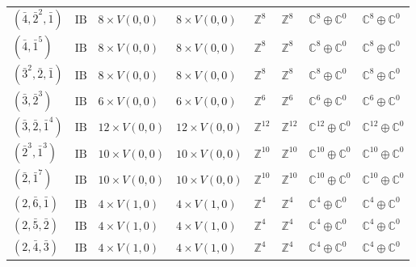 \documentclass[11pt,a4paper]{article}
\begin{document}
\begin{appendix}
\begin{table}
\begin{tabular}{C{2.65cm}C{0.85cm}C{3.0cm}C{3.0cm}C{2.25cm}C{2.25cm}C{1.55cm}C{1.55cm}}
\((\bar{4}, \bar{2}^{2}, \bar{1})\) & \(\mathrm{IB}\) & \(8 \times V(0,0)\) & \(8 \times V(0,0)\) & \(\mathbb{Z}^{8}\) & \(\mathbb{Z}^{8}\) & \(\mathbb{C}^{8} \oplus \mathbb{C}^{0}\) & \(\mathbb{C}^{8} \oplus \mathbb{C}^{0}\) \\
\((\bar{4}, \bar{1}^{5})\) & \(\mathrm{IB}\) & \(8 \times V(0,0)\) & \(8 \times V(0,0)\) & \(\mathbb{Z}^{8}\) & \(\mathbb{Z}^{8}\) & \(\mathbb{C}^{8} \oplus \mathbb{C}^{0}\) & \(\mathbb{C}^{8} \oplus \mathbb{C}^{0}\) \\
\((\bar{3}^{2}, \bar{2}, \bar{1})\) & \(\mathrm{IB}\) & \(8 \times V(0,0)\) & \(8 \times V(0,0)\) & \(\mathbb{Z}^{8}\) & \(\mathbb{Z}^{8}\) & \(\mathbb{C}^{8} \oplus \mathbb{C}^{0}\) & \(\mathbb{C}^{8} \oplus \mathbb{C}^{0}\) \\
\((\bar{3}, \bar{2}^{3})\) & \(\mathrm{IB}\) & \(6 \times V(0,0)\) & \(6 \times V(0,0)\) & \(\mathbb{Z}^{6}\) & \(\mathbb{Z}^{6}\) & \(\mathbb{C}^{6} \oplus \mathbb{C}^{0}\) & \(\mathbb{C}^{6} \oplus \mathbb{C}^{0}\) \\
\((\bar{3}, \bar{2}, \bar{1}^{4})\) & \(\mathrm{IB}\) & \(12 \times V(0,0)\) & \(12 \times V(0,0)\) & \(\mathbb{Z}^{12}\) & \(\mathbb{Z}^{12}\) & \(\mathbb{C}^{12} \oplus \mathbb{C}^{0}\) & \(\mathbb{C}^{12} \oplus \mathbb{C}^{0}\) \\
\((\bar{2}^{3}, \bar{1}^{3})\) & \(\mathrm{IB}\) & \(10 \times V(0,0)\) & \(10 \times V(0,0)\) & \(\mathbb{Z}^{10}\) & \(\mathbb{Z}^{10}\) & \(\mathbb{C}^{10} \oplus \mathbb{C}^{0}\) & \(\mathbb{C}^{10} \oplus \mathbb{C}^{0}\) \\
\((\bar{2}, \bar{1}^{7})\) & \(\mathrm{IB}\) & \(10 \times V(0,0)\) & \(10 \times V(0,0)\) & \(\mathbb{Z}^{10}\) & \(\mathbb{Z}^{10}\) & \(\mathbb{C}^{10} \oplus \mathbb{C}^{0}\) & \(\mathbb{C}^{10} \oplus \mathbb{C}^{0}\) \\
\((2, \bar{6}, \bar{1})\) & \(\mathrm{IB}\) & \(4 \times V(1,0)\) & \(4 \times V(1,0)\) & \(\mathbb{Z}^{4}\) & \(\mathbb{Z}^{4}\) & \(\mathbb{C}^{4} \oplus \mathbb{C}^{0}\) & \(\mathbb{C}^{4} \oplus \mathbb{C}^{0}\) \\
\((2, \bar{5}, \bar{2})\) & \(\mathrm{IB}\) & \(4 \times V(1,0)\) & \(4 \times V(1,0)\) & \(\mathbb{Z}^{4}\) & \(\mathbb{Z}^{4}\) & \(\mathbb{C}^{4} \oplus \mathbb{C}^{0}\) & \(\mathbb{C}^{4} \oplus \mathbb{C}^{0}\) \\
\((2, \bar{4}, \bar{3})\) & \(\mathrm{IB}\) & \(4 \times V(1,0)\) & \(4 \times V(1,0)\) & \(\mathbb{Z}^{4}\) & \(\mathbb{Z}^{4}\) & \(\mathbb{C}^{4} \oplus \mathbb{C}^{0}\) & \(\mathbb{C}^{4} \oplus \mathbb{C}^{0}\) \\

\end{tabular}
\end{table}
\end{appendix}
\end{document}

